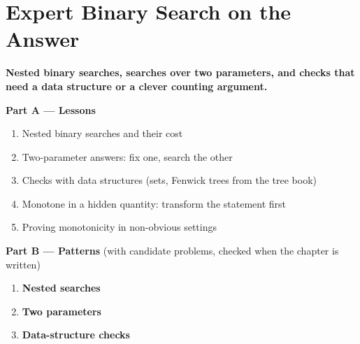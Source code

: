 \chapter{Expert Binary Search on the Answer}
\label{ch:expert_answer}

\begin{tcolorbox}[enhanced, colback=white, colframe=secondaryblue, boxrule=1pt, arc=2mm]
\textbf{\large\textcolor{primaryblue}{Nested binary searches, searches over two parameters, and checks that need a data structure or a clever counting argument.}}
\end{tcolorbox}


\begin{plannedbox}
\textbf{Part A --- Lessons}
\begin{enumerate}[leftmargin=*, label=\textbf{A\arabic*.}, itemsep=1pt]
    \item Nested binary searches and their cost
    \item Two-parameter answers: fix one, search the other
    \item Checks with data structures (sets, Fenwick trees from the tree book)
    \item Monotone in a hidden quantity: transform the statement first
    \item Proving monotonicity in non-obvious settings
\end{enumerate}
\textbf{Part B --- Patterns} (with candidate problems, checked when the chapter is written)
\begin{enumerate}[leftmargin=*, label=\textbf{P\arabic*.}, itemsep=1pt]
    \item \textbf{Nested searches}
    \item \textbf{Two parameters}
    \item \textbf{Data-structure checks}
\end{enumerate}
\end{plannedbox}
